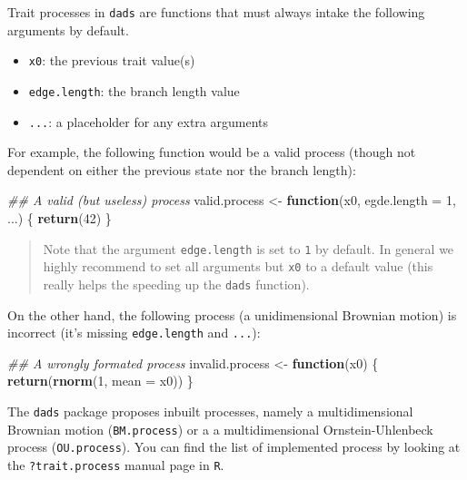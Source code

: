 \documentclass[]{book}
\newenvironment{Shaded}{\begin{snugshade}}{\end{snugshade}}
\newcommand{\CommentTok}[1]{\textcolor[rgb]{0.56,0.35,0.01}{\textit{#1}}}
\newcommand{\ControlFlowTok}[1]{\textcolor[rgb]{0.13,0.29,0.53}{\textbf{#1}}}
\newcommand{\DataTypeTok}[1]{\textcolor[rgb]{0.13,0.29,0.53}{#1}}
\newcommand{\DecValTok}[1]{\textcolor[rgb]{0.00,0.00,0.81}{#1}}
\newcommand{\KeywordTok}[1]{\textcolor[rgb]{0.13,0.29,0.53}{\textbf{#1}}}
\newcommand{\NormalTok}[1]{#1}
\newcommand{\StringTok}[1]{\textcolor[rgb]{0.31,0.60,0.02}{#1}}
\providecommand{\tightlist}{%
  \setlength{\itemsep}{0pt}\setlength{\parskip}{0pt}}
\begin{document}
Trait processes in \texttt{dads} are functions that must always intake the following arguments by default.

\begin{itemize}
\tightlist
\item
  \texttt{x0}: the previous trait value(s)
\item
  \texttt{edge.length}: the branch length value
\item
  \texttt{...}: a placeholder for any extra arguments
\end{itemize}

For example, the following function would be a valid process (though not dependent on either the previous state nor the branch length):

\begin{Shaded}
\begin{Highlighting}[]
\CommentTok{## A valid (but useless) process}
\NormalTok{valid.process <-}\StringTok{ }\ControlFlowTok{function}\NormalTok{(x0, }\DataTypeTok{egde.length =} \DecValTok{1}\NormalTok{, ...) \{}
    \KeywordTok{return}\NormalTok{(}\DecValTok{42}\NormalTok{)}
\NormalTok{\}}
\end{Highlighting}
\end{Shaded}

\begin{quote}
Note that the argument \texttt{edge.length} is set to \texttt{1} by default. In general we highly recommend to set all arguments but \texttt{x0} to a default value (this really helps the speeding up the \texttt{dads} function).
\end{quote}

On the other hand, the following process (a unidimensional Brownian motion) is incorrect (it's missing \texttt{edge.length} and \texttt{...}):

\begin{Shaded}
\begin{Highlighting}[]
\CommentTok{## A wrongly formated process}
\NormalTok{invalid.process <-}\StringTok{ }\ControlFlowTok{function}\NormalTok{(x0) \{}
    \KeywordTok{return}\NormalTok{(}\KeywordTok{rnorm}\NormalTok{(}\DecValTok{1}\NormalTok{, }\DataTypeTok{mean =}\NormalTok{ x0))}
\NormalTok{\}}
\end{Highlighting}
\end{Shaded}

The \texttt{dads} package proposes inbuilt processes, namely a multidimensional Brownian motion (\texttt{BM.process}) or a a multidimensional Ornstein-Uhlenbeck process (\texttt{OU.process}).
You can find the list of implemented process by looking at the \texttt{?trait.process} manual page in \texttt{R}.
\end{document}
